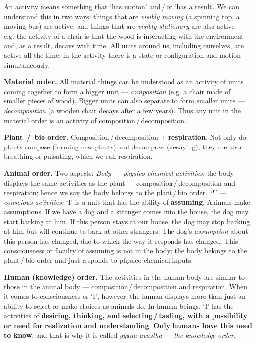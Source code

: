 
\ans An activity means something that `has motion' and\,/\,or `has a result'.
We can understand this in two ways: things that are \emph{visibly moving} (a
spinning top, a moving bus) are active; and things that are \emph{visibly
stationary} are also active --- e.g. the activity of a chair is that the wood
is interacting with the environment and, as a result, decays with time. All
units around us, including ourselves, are active all the time; in the activity
there is a state or configuration and motion simultaneously.

\begin{abul}
\item \textbf{Material order.} All material things can be understood as an
      activity of units coming together to form a bigger unit ---
      \emph{composition} (e.g. a chair made of smaller pieces of wood). Bigger
      units can also separate to form smaller units --- \emph{decomposition}
      (a wooden chair decays after a few years). Thus any unit in the material
      order is an activity of composition\,/\,decomposition.
\item \textbf{Plant \,/\, bio order.} Composition\,/\,decomposition $+$
      \textbf{respiration}. Not only do plants compose (forming new plants)
      and decompose (decaying), they are also breathing or pulsating, which we
      call respiration.
\item \textbf{Animal order.} Two aspects:
      \emph{Body --- physico-chemical activities:} the body displays the same
      activities as the plant --- composition\,/\,decomposition and
      respiration; hence we say the body belongs to the plant\,/\,bio order.
      \emph{`I' --- conscious activities:} `I' is a unit that has the ability
      of \textbf{assuming}. Animals make assumptions. If we have a dog and a
      stranger comes into the house, the dog may start barking at him. If this
      person stays at our house, the dog may stop barking at him but will
      continue to bark at other strangers. The dog's \emph{assumption} about
      this person has changed, due to which the way it responds has changed.
      This consciousness or faculty of assuming is not in the body; the body
      belongs to the plant\,/\,bio order and just responds to physico-chemical
      inputs.
\item \textbf{Human (knowledge) order.} The activities in the human body are
      similar to those in the animal body --- composition\,/\,decomposition
      and respiration. When it comes to consciousness or `I', however, the
      human displays more than just an ability to select or make choices as
      animals do. In human beings, `I' has the activities of \textbf{desiring,
      thinking, and selecting\,/\,tasting, with a possibility or need for
      realization and understanding}. \textbf{Only humans have this need to
      know}, and that is why it is called \emph{gyana avastha --- the
      knowledge order}.
\end{abul}

